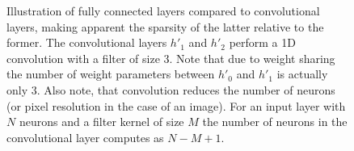 \begin{figure}
    \centering
{}
\caption[Illustration of convolutional layers]{Illustration of fully connected layers compared to convolutional layers, making apparent the sparsity of the latter relative to the former. The convolutional layers $h'_1$ and $h'_2$ perform a 1D convolution with a filter of size $3$. Note that due to weight sharing the number of weight parameters between $h'_0$ and $h'_1$ is actually only $3$. Also note, that convolution reduces the number of neurons (or pixel resolution in the case of an image). For an input layer with $N$ neurons and a filter kernel of size $M$ the number of neurons in the convolutional layer computes as $N-M+1$. }\label{fig:convolutional}
\end{figure}\noindent
